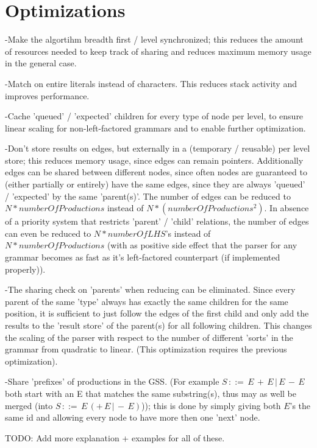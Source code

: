 \documentclass[a4paper,10pt]{article}
\begin{document}
\section{Optimizations}

-Make the algortihm breadth first / level synchronized; this reduces the amount of resources needed to keep track of sharing and reduces maximum memory usage in the general case.

-Match on entire literals instead of characters. This reduces stack activity and improves performance.

-Cache 'queued' / 'expected' children for every type of node per level, to ensure linear scaling for non-left-factored grammars and to enable further optimization.

-Don't store results on edges, but externally in a (temporary / reusable) per level store; this reduces memory usage, since edges can remain pointers. Additionally edges can be shared between different nodes, since often nodes are guaranteed to (either partially or entirely) have the same edges, since they are always 'queued' / 'expected' by the same 'parent(s)'. The number of edges can be reduced to $N * numberOfProductions$ instead of $N * (numberOfProductions^{2})$. In absence of a priority system that restricts 'parent' / 'child' relations, the number of edges can even be reduced to $N * numberOfLHS$'s instead of $N * numberOfProductions$ (with as positive side effect that the parser for any grammar becomes as fast as it's left-factored counterpart (if implemented properly)).

-The sharing check on 'parents' when reducing can be eliminated. Since every parent of the same 'type' always has exactly the same children for the same position, it is sufficient to just follow the edges of the first child and only add the results to the 'result store' of the parent(s) for all following children. This changes the scaling of the parser with respect to the number of different 'sorts' in the grammar from quadratic to linear. (This optimization requires the previous optimization).

-Share 'prefixes' of productions in the GSS. (For example $S\,::=\,E\,+\,E\,|\,E\,-\,E$ both start with an E that matches the same substring(s), thus may as well be merged (into $S\,::=\,E\,(+\,E\,|\,-\,E)$)); this is done by simply giving both $E$'s the same id and allowing every node to have more then one 'next' node.

TODO: Add more explanation + examples for all of these.
\end{document}
